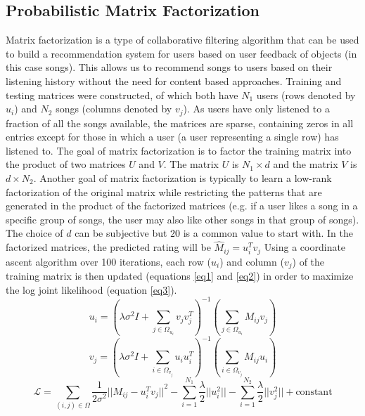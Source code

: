 \documentclass[12pt,preprint]{aastex}
\newcommand{\TRANSPOSE}{\ensuremath{T}}
\begin{document}
\subsection{Probabilistic Matrix Factorization}
Matrix factorization is a type of collaborative filtering algorithm that can be used to build a recommendation system for users based on user feedback of objects (in this case songs). This allows us to recommend songs to users based on their listening history without the need for content based approaches. 
Training and testing matrices were constructed, of which both have $N_1$ users (rows denoted by $u_i$) and $N_2$ songs (columns denoted by $v_j$). As users have only listened to a fraction of all the songs available, the matrices are sparse, containing zeros in all entries except for those in which a user (a user representing a single row) has listened to. The goal of matrix factorization is to factor the training matrix into the product of two matrices $U$ and $V$.  The matrix $U$ is $N_1 \times d$ and the matrix $V$ is $d \times N_2$. Another goal of matrix factorization is typically to learn a low-rank factorization of the original matrix while restricting the patterns that are generated in the product of the factorized matrices (e.g. if a user likes a song in a specific group of songs, the user may also like other songs in that group of songs). The choice of $d$ can be subjective but $20$ is a common value to start with. In the factorized matrices, the predicted rating will be $\hat{M}_{ij} = u_i^\TRANSPOSE  v_j$
Using a coordinate ascent algorithm over 100 iterations, each row ($u_i$) and column ($v_j$) of the training matrix is then updated (equations \ref{eq1} and \ref{eq2}) in order to maximize the log joint likelihood (equation \ref{eq3}).
\begin{equation}
u_i = \left( \lambda\sigma^2 I + \sum_{j \in \Omega_{u_i}} v_j v_j^\TRANSPOSE \right)^{-1}\left(\sum_{j \in \Omega_{u_i}} M_{ij} v_{j} \right)
\label{eq1}
\end{equation}
\begin{equation}
v_j = \left( \lambda\sigma^2 I + \sum_{i \in \Omega_{v_j}} u_i u_i^\TRANSPOSE  \right)^{-1}\left(\sum_{i \in \Omega_{v_j}} M_{ij} u_{i} \right)
\label{eq2}
\end{equation}
\begin{equation}
\mathcal{L} = \sum_{(i,j) \in \Omega} \frac{1}{2\sigma^2} {|| M_{ij} - u_i^\TRANSPOSE  v_j||}^2 - \sum_{i=1}^{N_1} \frac{\lambda}{2} ||u_i^2 || - \sum_{i=1}^{N_2} \frac{\lambda}{2} ||v_j^2 || + \text{constant}
\label{eq3} 
\end{equation}
\end{document}
